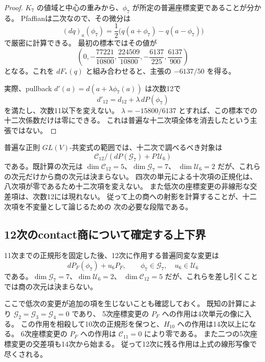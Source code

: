 \documentclass[a4paper,11pt]{ltjsarticle}
\theoremstyle{definition}
\begin{document}
\begin{proof}
$K_7$ の値域と中心の重みから、$\phi_7$ が所定の普遍座標変更であることが分かる。
Pfaffianは二次なので、その微分は
\[
 (dq)_a(\phi_7)=\frac12\bigl(q(a+\phi_7)-q(a-\phi_7)\bigr)
\]
で厳密に計算できる。
最初の標本ではその値が
\[
 \left(0,-\frac{77221}{10800},
 \frac{224509}{10800},-\frac{6137}{225},\frac{6137}{900}\right)
\]
となる。これを $dF_*(q)$ と組み合わせると、主張の $-6137/50$ を得る。

実際、pullback $d'(a)=d(a+\lambda\phi_7(a))$ は次数12で
\[
                       d'_{12}=d_{12}+\lambda\,dP(\phi_7)
\]
を満たし、次数11以下を変えない。
$\lambda=-15800/6137$ とすれば、この標本での十二次係数だけは零にできる。
これは普遍な十二次項全体を消去したという主張ではない。
\end{proof}

普遍な正則 $GL(V)$-共変式の範囲では、十二次で調べるべき対象は
\[
 \mathcal C_{12}\Big/
 \left(dP(\mathcal G_7)+P\,\mathcal U_6\right)
\]
である。既計算の次元は
$\dim\mathcal C_{12}=5$、$\dim\mathcal G_7=7$、
$\dim\mathcal U_6=2$ だが、これらの次元だけから商の次元は決まらない。
四次の単元による十次項の正規化は、八次項が零であるため十二次項を変えない。
また低次の座標変更の非線形な交差項は、次数12には現れない。
従って上の商への射影を計算することが、十二次項を不変量として論じるための
次の必要な段階である。


\subsection{12次のcontact商について確定する上下界}
\label{subsec:degree-twelve-contact-bounds}

11次までの正規形を固定した後、12次に作用する普遍同変な変更は
\[
 dP_F(\phi_7)+u_6P_F,
 \qquad \phi_7\in\mathcal G_7,\quad u_6\in\mathcal U_6
\]
である。$\dim\mathcal G_7=7$、$\dim\mathcal U_6=2$、
$\dim\mathcal C_{12}=5$ だが、これらを差し引くことでは商の次元は決まらない。

ここで低次の変更が追加の項を生じないことも確認しておく。
既知の計算により $\mathcal G_2=\mathcal G_3=\mathcal G_4=0$ であり、
5次座標変更の $P_F$ への作用は4次単元の像に入る。
この作用を相殺して10次の正規形を保つと、$H_{10}$ への作用は14次以上になる。
6次座標変更の $P_F$ への作用は $\mathcal C_{11}=0$ により零である。
また二つの5次座標変更の交差項も14次から始まる。
従って12次に残る作用は上式の線形写像で尽くされる。
\end{document}
